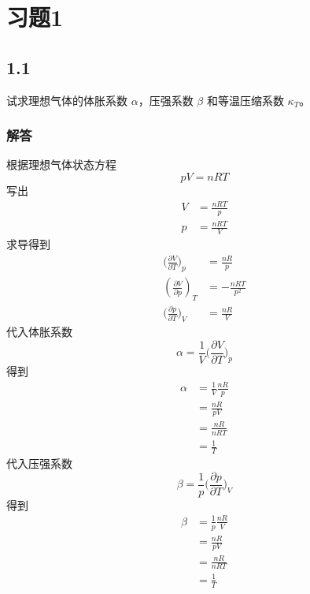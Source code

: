 \section{习题1}


\newpage
\subsection{1.1}
试求理想气体的体胀系数 $\alpha$，压强系数 $\beta$ 和等温压缩系数 $\kappa_T$。

\subsubsection{解答}
根据理想气体状态方程
\begin{equation}
    pV=nRT
\end{equation}
写出
\begin{equation}
    \begin{aligned}
        V&=\frac{nRT}{p}
\\
p&=\frac{nRT}{V}
    \end{aligned}
\end{equation}
求导得到
\begin{equation}
    \begin{aligned}
        \biggl( \frac{\partial V}{\partial T} \biggr) _p&=\frac{nR}{p}
\\
\left( \frac{\partial V}{\partial p} \right) _T&=-\frac{nRT}{p^2}
\\
\biggl( \frac{\partial p}{\partial T} \biggr) _V&=\frac{nR}{V}
    \end{aligned}
\end{equation}
代入体胀系数
\begin{equation}
    \alpha =\frac{1}{V}\biggl( \frac{\partial V}{\partial T} \biggr) _p
\end{equation}
得到
\begin{equation}
    \begin{aligned}
        \alpha &=\frac{1}{V}\frac{nR}{p}
\\
&=\frac{nR}{pV}
\\
&=\frac{nR}{nRT}
\\
&=\frac{1}{T}
    \end{aligned}
\end{equation}
代入压强系数
\begin{equation}
    \beta =\frac{1}{p}\biggl( \frac{\partial p}{\partial T} \biggr) _V
\end{equation}
得到
\begin{equation}
    \begin{aligned}
        \beta &=\frac{1}{p}\frac{nR}{V}
\\
&=\frac{nR}{pV}
\\
&=\frac{nR}{nRT}
\\
&=\frac{1}{T}
    \end{aligned}
\end{equation}
